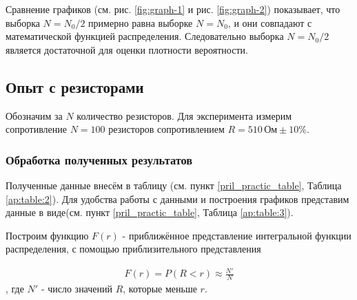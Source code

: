 Сравнение графиков (см. рис. \ref{fig:graph-1} и рис. \ref{fig:graph-2}) показывает, что выборка $N = N_0/2$ примерно равна выборке $N = N_0$, и они совпадают с математической функцией распределения. Следовательно выборка $N = N_0/2$ является достаточной для оценки плотности вероятности.

\subsection{Опыт с резисторами}
 
Обозначим за $N$ количество резисторов. Для эксперимента измерим сопротивление $N = 100$ резисторов сопротивлением $R = 510\,\text{Ом}\pm10\%$. 

\subsubsection{Обработка полученных результатов}
Полученные данные внесём в таблицу (см. пункт \ref{pril_practic_table}, Таблица \ref{ap:table:2}). Для удобства работы с данными и построения графиков представим данные в виде(см. пункт \ref{pril_practic_table}, Таблица \ref{ap:table:3}).

Построим функцию $F(r)$ - приближённое представление интегральной функции распределения, с помощью приблизительного представления 

\begin{align}
	F(r) = P(R < r) \approx \frac{N'}{N}
\end{align}
, где $N'$ - число значений $R$, которые меньше $r$.

